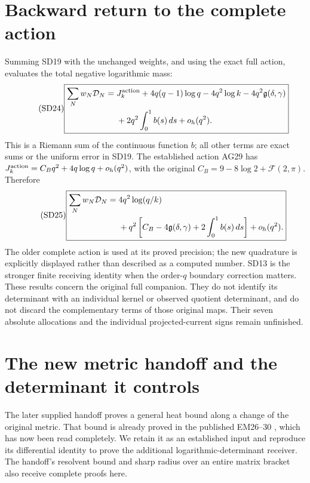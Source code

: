 \documentclass[11pt]{article}
\begin{document}
\section{Backward return to the complete action}
Summing SD19 with the unchanged weights, and using the exact full
action, evaluates the total negative logarithmic mass:
\begin{equation}\tag{SD24}
\boxed{\begin{aligned}
\sum_Nw_N\mathcal D_N={}&J_k^{\rm action}
+4q(q-1)\log q-4q^2\log k-4q^2\mathfrak g(\delta,\gamma)\\
&+2q^2\int_0^1 b(s)\,d s+o_h(q^2).
\end{aligned}}
\end{equation}
This is a Riemann sum of the continuous function $b$; all other terms
are exact sums or the uniform error in SD19. The established action
AG29 \cite{osd:AG} has $J_k^{\rm action}=C_Bq^2+4q\log q+o_h(q^2)$,
with the original $C_B=9-8\log2+\mathcal F(2,\pi)$. Therefore
\begin{equation}\tag{SD25}
\boxed{\begin{aligned}
\sum_Nw_N\mathcal D_N={}&4q^2\log(q/k)\\
&+q^2\left[C_B-4\mathfrak g(\delta,\gamma)
+2\int_0^1b(s)\,d s\right]+o_h(q^2).
\end{aligned}}
\end{equation}
The older complete action is used at its proved precision; the new
quadrature is explicitly displayed rather than described as a computed
number. SD13 is the stronger finite receiving identity when the
order-$q$ boundary correction matters. These results concern the
original full companion. They do not identify its determinant with an
individual kernel or observed quotient determinant, and do not discard
the complementary terms of those original maps. Their seven absolute
allocations and the individual projected-current signs remain unfinished.

\section{The new metric handoff and the determinant it controls}
The later supplied handoff \cite[Section 1]{osd:metricintake} proves a
general heat bound along a change of the original metric. That bound is
already proved in the published EM26--30 \cite{osd:EM}, which has now been
read completely. We retain it as an established input and reproduce its
differential identity to prove the additional logarithmic-determinant
receiver. The handoff's resolvent bound and sharp radius over an entire
matrix bracket also receive complete proofs here.
\end{document}
